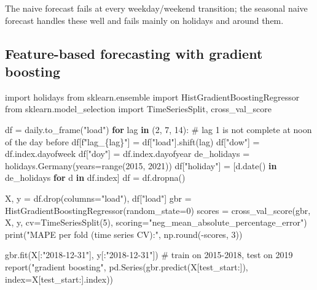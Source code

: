\documentclass[
  letterpaper,
  DIV=11,
  numbers=noendperiod]{scrreprt}
\newenvironment{Shaded}{\begin{snugshade}}{\end{snugshade}}
\newcommand{\BuiltInTok}[1]{\textcolor[rgb]{0.00,0.23,0.31}{#1}}
\newcommand{\CommentTok}[1]{\textcolor[rgb]{0.37,0.37,0.37}{#1}}
\newcommand{\ControlFlowTok}[1]{\textcolor[rgb]{0.00,0.23,0.31}{\textbf{#1}}}
\newcommand{\DecValTok}[1]{\textcolor[rgb]{0.68,0.00,0.00}{#1}}
\newcommand{\ImportTok}[1]{\textcolor[rgb]{0.00,0.46,0.62}{#1}}
\newcommand{\KeywordTok}[1]{\textcolor[rgb]{0.00,0.23,0.31}{\textbf{#1}}}
\newcommand{\NormalTok}[1]{\textcolor[rgb]{0.00,0.23,0.31}{#1}}
\newcommand{\OperatorTok}[1]{\textcolor[rgb]{0.37,0.37,0.37}{#1}}
\newcommand{\SpecialCharTok}[1]{\textcolor[rgb]{0.37,0.37,0.37}{#1}}
\newcommand{\SpecialStringTok}[1]{\textcolor[rgb]{0.13,0.47,0.30}{#1}}
\newcommand{\StringTok}[1]{\textcolor[rgb]{0.13,0.47,0.30}{#1}}
\begin{document}
The naive forecast fails at every weekday/weekend transition; the
seasonal naive forecast handles these well and fails mainly on holidays
and around them.

\subsection{Feature-based forecasting with gradient
boosting}\label{feature-based-forecasting-with-gradient-boosting}

\begin{Shaded}
\begin{Highlighting}[]
\ImportTok{import}\NormalTok{ holidays}
\ImportTok{from}\NormalTok{ sklearn.ensemble }\ImportTok{import}\NormalTok{ HistGradientBoostingRegressor}
\ImportTok{from}\NormalTok{ sklearn.model\_selection }\ImportTok{import}\NormalTok{ TimeSeriesSplit, cross\_val\_score}

\NormalTok{df }\OperatorTok{=}\NormalTok{ daily.to\_frame(}\StringTok{"load"}\NormalTok{)}
\ControlFlowTok{for}\NormalTok{ lag }\KeywordTok{in}\NormalTok{ (}\DecValTok{2}\NormalTok{, }\DecValTok{7}\NormalTok{, }\DecValTok{14}\NormalTok{):                             }\CommentTok{\# lag 1 is not complete at noon of the day before}
\NormalTok{    df[}\SpecialStringTok{f"lag\_}\SpecialCharTok{\{}\NormalTok{lag}\SpecialCharTok{\}}\SpecialStringTok{"}\NormalTok{] }\OperatorTok{=}\NormalTok{ df[}\StringTok{"load"}\NormalTok{].shift(lag)}
\NormalTok{df[}\StringTok{"dow"}\NormalTok{] }\OperatorTok{=}\NormalTok{ df.index.dayofweek}
\NormalTok{df[}\StringTok{"doy"}\NormalTok{] }\OperatorTok{=}\NormalTok{ df.index.dayofyear}
\NormalTok{de\_holidays }\OperatorTok{=}\NormalTok{ holidays.Germany(years}\OperatorTok{=}\BuiltInTok{range}\NormalTok{(}\DecValTok{2015}\NormalTok{, }\DecValTok{2021}\NormalTok{))}
\NormalTok{df[}\StringTok{"holiday"}\NormalTok{] }\OperatorTok{=}\NormalTok{ [d.date() }\KeywordTok{in}\NormalTok{ de\_holidays }\ControlFlowTok{for}\NormalTok{ d }\KeywordTok{in}\NormalTok{ df.index]}
\NormalTok{df }\OperatorTok{=}\NormalTok{ df.dropna()}

\NormalTok{X, y }\OperatorTok{=}\NormalTok{ df.drop(columns}\OperatorTok{=}\StringTok{"load"}\NormalTok{), df[}\StringTok{"load"}\NormalTok{]}
\NormalTok{gbr }\OperatorTok{=}\NormalTok{ HistGradientBoostingRegressor(random\_state}\OperatorTok{=}\DecValTok{0}\NormalTok{)}
\NormalTok{scores }\OperatorTok{=}\NormalTok{ cross\_val\_score(gbr, X, y, cv}\OperatorTok{=}\NormalTok{TimeSeriesSplit(}\DecValTok{5}\NormalTok{), scoring}\OperatorTok{=}\StringTok{"neg\_mean\_absolute\_percentage\_error"}\NormalTok{)}
\BuiltInTok{print}\NormalTok{(}\StringTok{"MAPE per fold (time series CV):"}\NormalTok{, np.}\BuiltInTok{round}\NormalTok{(}\OperatorTok{{-}}\NormalTok{scores, }\DecValTok{3}\NormalTok{))}

\NormalTok{gbr.fit(X[:}\StringTok{"2018{-}12{-}31"}\NormalTok{], y[:}\StringTok{"2018{-}12{-}31"}\NormalTok{])         }\CommentTok{\# train on 2015{-}2018, test on 2019}
\NormalTok{report(}\StringTok{"gradient boosting"}\NormalTok{, pd.Series(gbr.predict(X[test\_start:]), index}\OperatorTok{=}\NormalTok{X[test\_start:].index))}
\end{Highlighting}
\end{Shaded}
\end{document}
